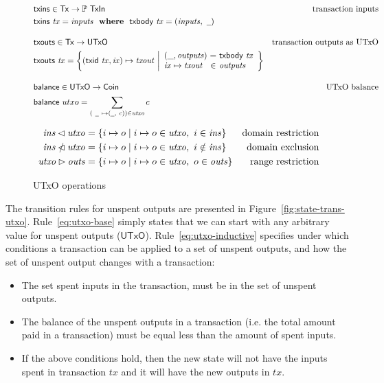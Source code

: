 \documentclass[11pt,a4paper]{article}
\newcommand{\powerset}[1]{\mathbb{P}~#1}
\newcommand{\restrictdom}{\lhd}
\newcommand{\subtractdom}{\mathbin{\slashed{\restrictdom}}}
\newcommand{\restrictrange}{\rhd}
\newcommand{\var}[1]{\mathit{#1}}
\newcommand{\fun}[1]{\mathsf{#1}}
\newcommand{\type}[1]{\mathsf{#1}}
\newcommand{\nextdef}{\\[1em]}
\newcommand{\where}{~ ~ \mathbf{where}~ ~ }
\newcommand{\Tx}{\type{Tx}}
\newcommand{\UTxO}{\type{UTxO}}
\newcommand{\Coin}{\type{Coin}}
\newcommand{\TxIn}{\type{TxIn}}
\newcommand{\txins}[1]{\fun{txins}~ \var{#1}}
\newcommand{\txbody}[1]{\fun{txbody}~ \var{#1}}
\newcommand{\wcard}[0]{\underline{\phantom{a}}}
\begin{document}
\begin{figure}
  \begin{align*}
    & \fun{txins} \in \Tx \to \powerset{\TxIn}
    & \text{transaction inputs} \\
    & \txins{tx} = \var{inputs} \where \txbody{tx} = (\var{inputs}, ~\wcard)
    \nextdef
    & \fun{txouts} \in \Tx \to \UTxO
    & \text{transaction outputs as UTxO} \\
    & \fun{txouts} ~ \var{tx} =
      \left\{ (\fun{txid} ~ \var{tx}, \var{ix}) \mapsto \var{txout} ~
      \middle| \begin{array}{l@{~}c@{~}l}
                 (\_, \var{outputs}) & = & \txbody{tx} \\
                 \var{ix} \mapsto \var{txout} & \in & \var{outputs}
               \end{array}
      \right\}
    \nextdef
    & \fun{balance} \in \UTxO \to \Coin
    & \text{UTxO balance} \\
    & \fun{balance} ~ utxo = \sum_{(~\wcard ~ \mapsto (\wcard, ~c)) \in \var{utxo}} c
  \end{align*}

  \begin{align*}
    \var{ins} \restrictdom \var{utxo}
    & = \{ i \mapsto o \mid i \mapsto o \in \var{utxo}, ~ i \in \var{ins} \}
    & \text{domain restriction}
    \\
    \var{ins} \subtractdom \var{utxo}
    & = \{ i \mapsto o \mid i \mapsto o \in \var{utxo}, ~ i \notin \var{ins} \}
    & \text{domain exclusion}
    \\
    \var{utxo} \restrictrange \var{outs}
    & = \{ i \mapsto o \mid i \mapsto o \in \var{utxo}, ~ o \in \var{outs} \}
    & \text{range restriction}
  \end{align*}
  \caption{UTxO operations}
  \label{fig:utxo-auxiliary-ops}
\end{figure}

The transition rules for unspent outputs are presented in
Figure~\ref{fig:state-trans-utxo}. Rule~\ref{eq:utxo-base} simply states that
we can start with any arbitrary value for unspent outputs ($\UTxO$).
Rule~\ref{eq:utxo-inductive} specifies under which conditions a transaction can
be applied to a set of unspent outputs, and how the set of unspent output changes
with a transaction:
\begin{itemize}
\item The set spent inputs in the transaction, must be in the set of unspent
  outputs.
\item The balance of the unspent outputs in a transaction (i.e. the total
  amount paid in a transaction) must be equal less than the amount of spent
  inputs.
\item If the above conditions hold, then the new state will not have the inputs
  spent in transaction $\var{tx}$ and it will have the new outputs in
  $\var{tx}$.
\end{itemize}
\end{document}

